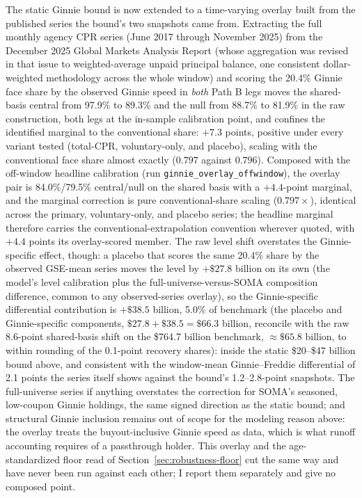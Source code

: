 \documentclass[12pt]{article}
\begin{document}
The static Ginnie bound is now extended to a time-varying overlay built from the published series the bound's two snapshots came from. Extracting the full monthly agency CPR series (June 2017 through November 2025) from the December 2025 Global Markets Analysis Report (whose aggregation was revised in that issue to weighted-average unpaid principal balance, one consistent dollar-weighted methodology across the whole window) and scoring the 20.4\% Ginnie face share by the observed Ginnie speed in \emph{both} Path B legs moves the shared-basis central from 97.9\% to 89.3\% and the null from 88.7\% to 81.9\% in the raw construction, both legs at the in-sample calibration point, and confines the identified marginal to the conventional share: $+7.3$ points, positive under every variant tested (total-CPR, voluntary-only, and placebo), scaling with the conventional face share almost exactly ($0.797$ against $0.796$). Composed with the off-window headline calibration (run \texttt{ginnie\_overlay\_offwindow}), the overlay pair is 84.0\%/79.5\% central/null on the shared basis with a $+4.4$-point marginal, and the marginal correction is pure conventional-share scaling ($0.797\times$), identical across the primary, voluntary-only, and placebo series; the headline marginal therefore carries the conventional-extrapolation convention wherever quoted, with $+4.4$ points its overlay-scored member. The raw level shift overstates the Ginnie-specific effect, though: a placebo that scores the same 20.4\% share by the observed GSE-mean series moves the level by $+\$27.8$ billion on its own (the model's level calibration plus the full-universe-versus-SOMA composition difference, common to any observed-series overlay), so the Ginnie-specific differential contribution is $+\$38.5$ billion, 5.0\% of benchmark (the placebo and Ginnie-specific components, $\$27.8 + \$38.5 = \$66.3$ billion, reconcile with the raw 8.6-point shared-basis shift on the \$764.7 billion benchmark, $\approx\$65.8$ billion, to within rounding of the 0.1-point recovery shares): inside the static \$20--\$47 billion bound above, and consistent with the window-mean Ginnie--Freddie differential of 2.1 points the series itself shows against the bound's 1.2--2.8-point snapshots. The full-universe series if anything overstates the correction for SOMA's seasoned, low-coupon Ginnie holdings, the same signed direction as the static bound; and structural Ginnie inclusion remains out of scope for the modeling reason above: the overlay treats the buyout-inclusive Ginnie speed as data, which is what runoff accounting requires of a passthrough holder. This overlay and the age-standardized floor read of Section~\ref{sec:robustness-floor} cut the same way and have never been run against each other; I report them separately and give no composed point.
\end{document}
